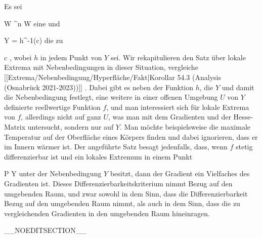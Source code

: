 {}
{

Es sei

\mavergleichskette
{\vergleichskette
{ W
}
{ \subseteq }{ \R^n
}
{  }{
}
{    }{
}
{   }{
}
}
{}{}{}
 { W } { \R
} {}
eine
und

\mavergleichskette
{\vergleichskette
{ Y
}
{ = }{ h^{-1}(c)
}
{  }{
}
{    }{
}
{   }{
}
}
{}{}{}
die
zu

\mavergleichskette
{\vergleichskette
{ c
}
{ \in }{ \R
}
{  }{
}
{    }{
}
{   }{
}
}
{}{}{,}
wobei $h$ in jedem Punkt von $Y$
sei. Wir rekapitulieren den Satz über lokale Extrema mit Nebenbedingungen in dieser Situation, vergleiche
[[Extrema/Nebenbedingung/Hyperfläche/Fakt|Korollar 54.3 (Analysis (Osnabrück 2021-2023))]]
 {} {.}
Dabei gibt es neben der Funktion $h$, die $Y$ und damit die Nebenbedingung festlegt, eine weitere in einer offenen Umgebung $U$ von $Y$ definierte reellwertige Funktion $f$, und man interessiert sich für lokale Extrema von $f$, allerdings nicht auf ganz $U$, was man mit dem Gradienten und der Hesse-Matrix untersucht, sondern nur auf $Y$. Man möchte beispielsweise die maximale Temperatur auf der Oberfläche eines Körpers finden und dabei ignorieren, dass er im Innern wärmer ist. Der angeführte Satz besagt jedenfalls, dass, wenn $f$ stetig differenzierbar ist und ein lokales Extremum in einem Punkt

\mavergleichskette
{\vergleichskette
{ P
}
{ \in }{ Y
}
{  }{
}
{    }{
}
{   }{
}
}
{}{}{}
unter der Nebenbedingung $Y$ besitzt, dann der Gradient
 ein Vielfaches des Gradienten
 ist. Dieses Differenzierbarkeitskriterium nimmt Bezug auf den umgebenden Raum, und zwar sowohl in dem Sinn, dass die Differenzierbarkeit Bezug auf den umgebenden Raum nimmt, als auch in dem Sinn, dass die zu vergleichenden Gradienten in den umgebenden Raum hineinragen.

}

__NOEDITSECTION__

